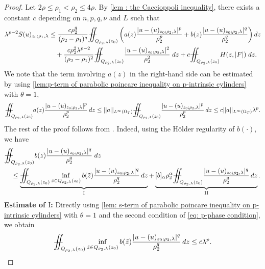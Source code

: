 \documentclass[11pt,oneside, english,reqno,twoside a4paper]{amsart}
\theoremstyle{definition}
\numberwithin{theorem}{section}
\numberwithin{equation}{section}
\newcommand{\la}{\lambda}
\newcommand{\iintss}{{\int\hspace{-0.28cm}\int}}
\newcommand{ \miints }{{\iintss\hspace{-0.56cm} -\hspace{-0.15cm}-}}
\newcommand{\miint}[1]{{\miints_{\hspace{-0.13cm}#1}}}
\begin{document}
\begin{proof}
Let $2\rho \leq \rho_1<\rho_2 \leq 4\rho$. By \cref{lem : the Caccioppoli inequality}, there exists a constant $c$ depending on $n,p,q,\nu$ and $L$ such that 
\begin{align}
\lambda^{p-2}S(u)_{z_0;\rho_1,\lambda}&\leq \frac{c\rho_2^q}{(\rho_2-\rho_1)^q}\miint{Q_{\rho_2,\lambda}(z_0)}\left( a(z)\frac{|u-(u)_{z_0;\rho_2,\lambda}|^p}{\rho^p_2}+b(z)\frac{|u-(u)_{z_0;\rho_2,\lambda}|^q}{\rho^q_2} \right) dz \nonumber\\
&\quad + \frac{c\rho_2^2 \lambda^{p-2}}{(\rho_2-\rho_1)^2}\miint{Q_{\rho_2,\lambda}(z_0)}\frac{|u-(u)_{z_0;\rho_2,\lambda}|^2}{\rho_2^2}\; dz +c\miint{Q_{\rho_2,\lambda}(z_0)} H(z,|F|)\; dz. \label{eq : second equation in lemma 3.4}
\end{align}
 We note that the term involving $a(z)$ in the right-hand side can be estimated by using \cref{lem:p-term of parabolic poincare inequality on p-intrinsic cylinders} with $\theta=1,$
 \begin{align*}
     \miint{Q_{\rho_2,\lambda}(z_0)} a(z)\frac{|u-(u)_{z_0;\rho_2,\lambda}|^p}{\rho^p_2}\, dz \leq ||a||_{L^{\infty}(\Omega_T)}\miint{Q_{\rho_2,\lambda}(z_0)}\frac{|u-(u)_{z_0;\rho_2,\lambda}|^p}{\rho^p_2}\, dz \leq c||a||_{L^{\infty}(\Omega_T)}\la^p.
 \end{align*}
 The rest of the proof follows from \cite[Lemma 4.3]{2023_Gradient_Higher_Integrability_for_Degenerate_Parabolic_Double-Phase_Systems}. Indeed, using the H\"{o}lder regularity of $b(\cdot), $ we have
 \begin{align*}
     &\miint{Q_{\rho_2, \lambda}(z_0)}b(z)\frac{|u-(u)_{z_0;\rho_2,\lambda}|^q}{\rho^q_2}\; dz\\
     &\quad \leq \underbrace{\miint{Q_{\rho_2, \lambda}(z_0)} \inf_{\tilde{z}\in Q_{\rho_2, \lambda}(z_0)}b(\tilde{z})\frac{|u-(u)_{z_0;\rho_2,\lambda}|^q}{\rho^q_2}\,dz}_{\mathrm{I}}+ \underbrace{[b]_{\alpha}\rho^{\alpha}_2\miint{Q_{\rho_2, \lambda}(z_0)} \frac{|u-(u)_{z_0;\rho_2,\lambda}|^q}{\rho^q_2}\,dz}_{\mathrm{II}}.
 \end{align*}
 \textbf{Estimate of $\mathrm{I}$:} Directly using \cref{lem: s-term of parabolic poincare inequality on p-intrinsic cylinders} with $\theta =1$ and the second condition of \eqref{eq: p-phase condition}, we obtain
 \begin{align*}
  \miint{Q_{\rho_2, \lambda}(z_0)} \inf_{\tilde{z}\in Q_{\rho_2, \lambda}(z_0)}b(\tilde{z})\frac{|u-(u)_{z_0;\rho_2,\lambda}|^q}{\rho^q_2}\,dz \leq c \lambda^p . 
 \end{align*}

\end{proof}
\end{document}

